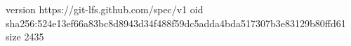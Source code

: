 version https://git-lfs.github.com/spec/v1
oid sha256:524e13ef66a83bc8d8943d34f488f59dc5adda4bda517307b3e83129b80ffd61
size 2435
